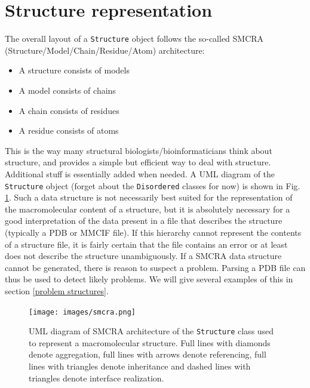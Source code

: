 \documentclass{report}
\begin{document}
\section{Structure representation}

The overall layout of a \texttt{Structure} object follows the so-called SMCRA
(Structure/Model/Chain/Residue/Atom) architecture:

\begin{itemize}
\item A structure consists of models
\item A model consists of chains
\item A chain consists of residues
\item A residue consists of atoms
\end{itemize}
This is the way many structural biologists/bioinformaticians think
about structure, and provides a simple but efficient way to deal with
structure. Additional stuff is essentially added when needed. A UML
diagram of the \texttt{Structure} object (forget about the \texttt{Disordered}
classes for now) is shown in Fig. \ref{fig:smcra}. Such a data structure is not
necessarily best suited for the representation of the macromolecular content of
a structure, but it is absolutely necessary for a good interpretation of the
data present in a file that describes the structure (typically a PDB or MMCIF
file). If this hierarchy cannot represent the contents of a structure file, it
is fairly certain that the file contains an error or at least does not describe
the structure unambiguously. If a SMCRA data structure cannot be generated,
there is reason to suspect a problem. Parsing a PDB file can thus be used to
detect likely problems. We will give several examples of this in section
\ref{problem structures}.

\begin{figure}[htbp]
\begin{htmlonly}
\end{htmlonly}
\begin{latexonly}
\centering
\texttt{[image: images/smcra.png]}
\end{latexonly}
\caption{UML diagram of SMCRA architecture of the \texttt{Structure} class used to represent a macromolecular structure.
Full lines with diamonds denote aggregation, full lines with
arrows denote referencing, full lines with triangles denote inheritance
and dashed lines with triangles denote interface realization.}
\label{fig:smcra}
\end{figure}
\end{document}
